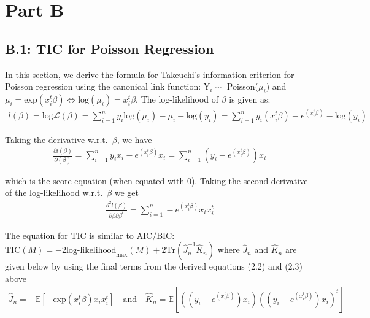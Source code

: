 \documentclass[paper=a4, fontsize=11pt]{scrartcl} %
\numberwithin{equation}{section} %
\begin{document}
\section{Part B}

\subsection*{B.1: TIC for Poisson Regression}

In this section, we derive the formula for Takeuchi's information criterion for Poisson regression using the canonical link function: Y$_i \sim $ Poisson($\mu_i$) and $\mu_i = \text{exp}(x_i^t\beta) \Leftrightarrow \text{log}(\mu_i) = x_i^t\beta$. The log-likelihood of $\beta$ is given as:
\begin{align}
l(\beta) = \text{log}\mathcal{L}(\beta) = \sum_{i = 1}^n y_i \text{log}(\mu_i) - \mu_i - \text{log}(y_i) = \sum_{i = 1}^n y_i(x_i^t\beta) - e^{(x_i^t\beta)} - \text{log}(y_i)
\end{align}

Taking the derivative w.r.t.\ $\beta$, we have
\begin{align}
\frac{\partial l(\beta)}{\partial(\beta)} = \sum_{i = 1}^n y_ix_i - e^{(x_i^t\beta)} x_i = \sum_{i = 1}^n \left(y_i - e^{(x_i^t\beta)}\right)x_i
\end{align}

which is the score equation (when equated with 0). Taking the second derivative of the log-likelihood w.r.t.\ $\beta$ we get
\begin{align}
\frac{\partial^2 l(\beta)}{\partial \beta \partial \beta^t} = \sum_{i = 1}^n -e^{(x_i^t\beta)} x_i x_i^t
\end{align}

The equation for TIC is similar to AIC/BIC: $\text{TIC}(M) = -2 \text{log-likelihood}_{\text{max}}(M) + 2\text{Tr}(\hat{J}_n^{-1} \hat{K}_n)$ where $\hat{J}_n$ and $\hat{K}_n$ are given below by using the final terms from the derived equations (2.2) and (2.3) above
\begin{align}
\hat{J}_n = - \mathbb{E} \left[- \text{exp}(x_i^t \beta) x_i x_i^t \right] \quad \text{and} \quad \hat{K}_n = 
\mathbb{E} \left[ 
\left( (y_i - e^{(x_i^t\beta)}) x_i \right) 
\left( (y_i - e^{(x_i^t\beta)}) x_i \right)^t 
\right]
\end{align}
\end{document}
